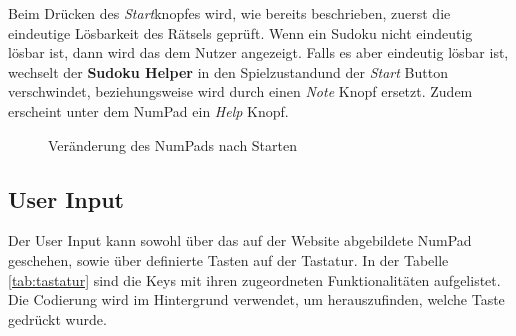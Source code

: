 Beim Drücken des \textit{Start}knopfes wird, wie bereits beschrieben, zuerst die eindeutige Lösbarkeit des Rätsels geprüft. Wenn ein Sudoku nicht eindeutig lösbar ist, dann wird das dem Nutzer angezeigt. Falls es aber eindeutig lösbar ist, wechselt der \textbf{Sudoku Helper} in den \glqq Spielzustand\grqq\space und der \textit{Start} Button verschwindet, beziehungsweise wird durch einen \textit{Note} Knopf ersetzt. Zudem erscheint unter dem NumPad ein \textit{Help} Knopf. 



\begin{figure}[H]
	\centering
	\qquad
	\caption{Veränderung des NumPads nach Starten}%
\end{figure}

\subsection{User Input}

Der User Input kann sowohl über das auf der Website abgebildete NumPad geschehen, sowie über definierte Tasten auf der Tastatur. In der Tabelle \ref{tab:tastatur} sind die Keys mit ihren zugeordneten Funktionalitäten aufgelistet. Die Codierung wird im Hintergrund verwendet, um herauszufinden, welche Taste gedrückt wurde.

